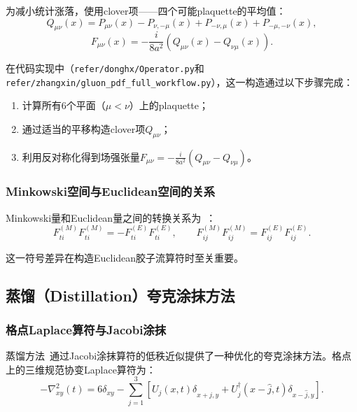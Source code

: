 \documentclass[12pt,a4paper]{ctexart}
\theoremstyle{definition}
\begin{document}
为减小统计涨落，使用clover项——四个可能plaquette的平均值：
\begin{equation}\label{eq:Qmunu}
    Q_{\mu\nu}(x) = P_{\mu\nu}(x) - P_{\nu,-\mu}(x) + P_{-\nu,\mu}(x) + P_{-\mu,-\nu}(x),
\end{equation}
\begin{equation}\label{eq:F_clover}
    F_{\mu\nu}(x) = -\frac{i}{8a^2} (Q_{\mu\nu}(x) - Q_{\nu\mu}(x)).
\end{equation}

在代码实现中（\texttt{refer/donghx/Operator.py}和\texttt{refer/zhangxin/gluon\_pdf\_full\_workflow.py}），这一构造通过以下步骤完成：
\begin{enumerate}
    \item 计算所有6个平面（$\mu<\nu$）上的plaquette；
    \item 通过适当的平移构造clover项$Q_{\mu\nu}$；
    \item 利用反对称化得到场强张量$F_{\mu\nu} = -\frac{i}{8a^2}(Q_{\mu\nu} - Q_{\nu\mu})$。
\end{enumerate}

\subsubsection{Minkowski空间与Euclidean空间的关系}

Minkowski量和Euclidean量之间的转换关系为~\cite{Balitsky:2019krj}：
\begin{equation}\label{eq:ME_relation}
    F^{(M)}_{ti} F^{(M)}_{ti} = -F^{(E)}_{ti} F^{(E)}_{ti}, \qquad
    F^{(M)}_{ij} F^{(M)}_{ij} = F^{(E)}_{ij} F^{(E)}_{ij}.
\end{equation}

这一符号差异在构造Euclidean胶子流算符时至关重要。

\subsection{蒸馏（Distillation）夸克涂抹方法}

\subsubsection{格点Laplace算符与Jacobi涂抹}

蒸馏方法~\cite{Peardon:2009gh}通过Jacobi涂抹算符的低秩近似提供了一种优化的夸克涂抹方法。格点上的三维规范协变Laplace算符为：
\begin{equation}\label{eq:laplacian}
    -\nabla^2_{xy}(t) = 6\delta_{xy} - \sum_{j=1}^{3} \left[U_j(x,t)\delta_{x+\hat{j},y} + U^\dagger_j(x-\hat{j},t)\delta_{x-\hat{j},y}\right].
\end{equation}
\end{document}
